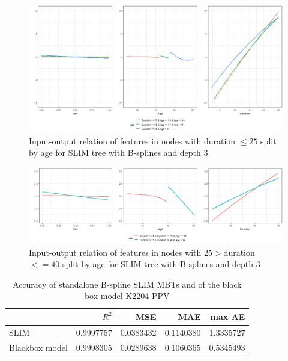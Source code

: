 \begin{figure}[!htb]
    \centering    
    \includegraphics[width = 16cm]{Figures/insurance_use_case/k2204_PPV/effects_age_low_duration.png}
    \caption{Input-output relation of features in nodes with duration $\leq 25$ split by age for SLIM tree with B-splines and depth 3}
    \label{fig:ins_k2204_ppv_effects_age_low_duration}
\end{figure}

\begin{figure}[!htb]
    \centering    
    \includegraphics[width = 16cm]{Figures/insurance_use_case/k2204_PPV/effects_age_medium_duration.png}
    \caption{Input-output relation of features in nodes with $25 > $duration $<= 40$ split by age for SLIM tree with B-splines and depth 3}
    \label{fig:ins_k2204_ppv_effects_age_medium_duration}
\end{figure}


\begin{table}[!htb]

\caption{Accuracy of standalone B-spline SLIM MBTs and of the black box model K2204 PPV}
\centering \scriptsize
\begin{tabular}[t]{l|r|r|r|r}
\hline
  & $R^2$ & MSE & MAE & max AE \\
\hline
SLIM & 0.9997757 & 0.0383432 & 0.1140380 & 1.3335727\\
Blackbox model & 0.9998305 & 0.0289638 & 0.1060365 & 0.5345493\\
\hline
\end{tabular}
\label{tab:ins_k2204_ppv_standalone_slim}
\end{table}







